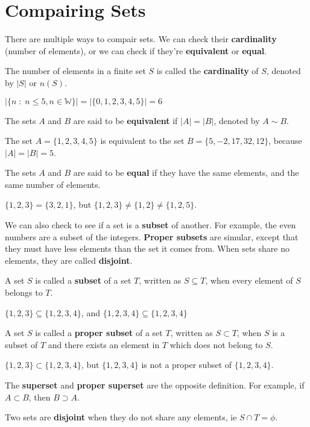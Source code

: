 \section{Compairing Sets}

There are multiple ways to compair sets. We can check their {\bf cardinality} (number of elements), or we can check if they're {\bf equivalent} or {\bf equal}.

\mydefine
{
	The number of elements in a finite set $S$ is called the {\bf cardinality} of $S$, denoted by $|S|$ or $n(S)$.
}

\myexample
{
	$|\{ n \;:\; n \leq 5, n \in \mathbb{W}\}| = |\{0,1,2,3,4,5\}| = 6$
}

\mydefine
{
	The sets $A$ and $B$ are said to be {\bf equivalent} if $|A| = |B|$, denoted by $A \sim B$.
}

\myexample
{
	The set $A = \{1,2,3,4,5\}$ is equivalent to the set $B = \{5,-2,17,32,12\}$, because $|A| = |B| = 5$.
}

\mydefine
{
	The sets $A$ and $B$ are said to be {\bf equal} if they have the same elements, and the same number of elements.
}

\myexample
{
	$\{1,2,3\} = \{3,2,1\}$, but $\{1,2,3\} \ne \{1,2\} \ne \{1,2,5\}$.
}

We can also check to see if a set is a {\bf subset} of another. For example, the even numbers are a subset of the integers. {\bf Proper subsets} are simular, except that they must have less elements than the set it comes from. When sets share no elements, they are called {\bf disjoint}.

\mydefine
{
	A set $S$ is called a {\bf subset} of a set $T$, written as $S \subseteq T$, when every element of $S$ belongs to $T$.
}

\myexample
{
	$\{1,2,3\} \subseteq \{1,2,3,4\}$, and $\{1,2,3,4\} \subseteq \{1,2,3,4\}$
}

\mydefine
{
	A set $S$ is called a {\bf proper subset} of a set $T$, written as $S \subset T$, when $S$ is a subset of $T$ and there exists an element in $T$ which does not belong to $S$.
}

\myexample
{
	$\{1,2,3\} \subset \{1,2,3,4\}$, but $\{1,2,3,4\}$ is not a proper subset of $\{1,2,3,4\}$.
}

The {\bf superset} and {\bf proper superset} are the opposite definition. For example, if $A \subset B$, then $B \supset A$.

\mydefine
{
	Two sets are {\bf disjoint} when they do not share any elements, ie $S \cap T=\phi$.
}

